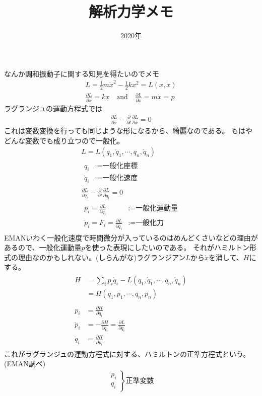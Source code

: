 \documentclass{jsarticle}
\begin{document}
\title{解析力学メモ}
\date{2020年}
\maketitle


なんか調和振動子に関する知見を得たいのでメモ
\begin{gather*}
  L = \frac{1}{2} m \dot{x}^2 - \frac{1}{2} k x^2 = L(x,\dot{x})\\
  \frac{\partial L}{\partial x} = kx  \quad \text{and} \quad \frac{\partial L}{\partial \dot{x}} = m\dot{x} = p
\end{gather*}
ラグランジュの運動方程式では
\begin{gather*}
  \frac{\partial L}{\partial x} - \frac{\partial}{\partial t} \frac{\partial L }{\partial \dot{x}} = 0 
\end{gather*}
これは変数変換を行っても同じような形になるから、綺麗なのである。
もはやどんな変数でも成り立つので一般化。
\begin{gather*}
  L = L(q_1,\dot{q}_1,\cdots,q_n,\dot{q}_n)\\[10pt]
  \begin{aligned}
    q_i &:= \mbox{一般化座標}\\
    \dot{q}_i &:= \mbox{一般化速度}
  \end{aligned}\\[10pt]
  \frac{\partial L}{\partial q_i} - \frac{\partial}{\partial t} \frac{\partial L }{\partial \dot{q}_i} = 0 \\[10pt]
  \begin{aligned}
    p_i = \frac{\partial L }{\partial \dot{q}_i} &:= \mbox{一般化運動量}\\
    \dot{p}_i = F_i = \frac{\partial L}{\partial q_i} &:= \mbox{一般化力}
  \end{aligned}
\end{gather*}
EMANいわく一般化速度で時間微分が入っているのはめんどくさいなどの理由があるので、一般化運動量$p$を使った表現にしたいのである。
それがハミルトン形式の理由なのかもしれない。(しらんがな)ラグランジアン$L$から$\dot{x}$を消して、$H$にする。
\begin{gather*}
  \begin{aligned}
    H & = \sum_i p_i \dot{q}_i - L (q_1,\dot{q}_1,\cdots,q_n,\dot{q}_n)\\
      & = H(q_1,p_1, \cdots , q_n, p_n)
  \end{aligned}\\[10pt]
  \begin{aligned}
    p_i & = \frac{\partial H}{\partial \dot{q}_i}\\
    \dot{p}_i & = - \frac{\partial H}{\partial q_i} = \frac{\partial L}{\partial q_i} \\
    \dot{q}_i & = \frac{\partial H}{\partial p_i}
  \end{aligned}
\end{gather*}
これがラグランジュの運動方程式に対する、ハミルトンの正準方程式という。(EMAN調べ)
\begin{gather*}
  \left.
  \begin{gathered}
    p_i\\
    q_i
  \end{gathered}
  \right\} \text{正準変数}
\end{gather*}
\end{document}
